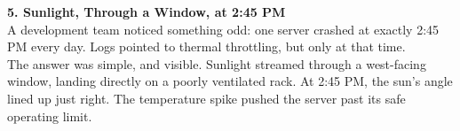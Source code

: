 {\textbf{5. Sunlight, Through a Window, at 2:45 PM} \\[4pt]
A development team noticed something odd: one server crashed at exactly 2:45 PM every day. Logs pointed to thermal throttling, but only at that time.\\
The answer was simple, and visible. Sunlight streamed through a west-facing window, landing directly on a poorly ventilated rack. At 2:45 PM, the sun’s angle lined up just right. The temperature spike pushed the server past its safe operating limit.%
}
